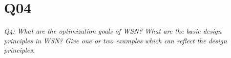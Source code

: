 \chapter{Q04}
\emph{Q4: What are the optimization goals of WSN? What are the basic design
principles in WSN? Give one or two examples which can reflect the design
principles.}
